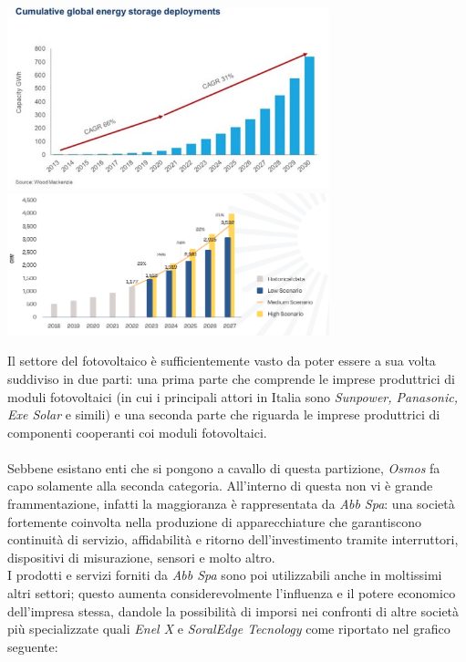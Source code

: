 \documentclass[a4paper, 12pt]{article}
\begin{document}
	\begin{center}
		\includegraphics[width=0.7\textwidth]{Images/previsioni_solare.jpg}
		\includegraphics[width=0.7\textwidth]{Images/andamento_pannelli2.png}
	\end{center}
	Il settore del fotovoltaico è sufficientemente vasto da poter essere a sua volta suddiviso in due parti: una prima parte che comprende le imprese produttrici di moduli fotovoltaici (in cui i principali attori in Italia sono \emph{Sunpower, Panasonic, Exe Solar} e simili) e una seconda parte che riguarda le imprese produttrici di componenti cooperanti coi moduli fotovoltaici.\\\\
	Sebbene esistano enti che si pongono a cavallo di questa partizione, \emph{Osmos} fa capo solamente alla seconda categoria. All'interno di questa non vi è grande frammentazione, infatti la maggioranza è rappresentata da \emph{Abb Spa}: una società fortemente coinvolta nella produzione di apparecchiature che garantiscono continuità di servizio, affidabilità e ritorno dell'investimento tramite interruttori, dispositivi di misurazione, sensori e molto altro.\\
	I prodotti e servizi forniti da \emph{Abb Spa} sono poi utilizzabili anche in moltissimi altri settori; questo aumenta considerevolmente l'influenza e il potere economico dell'impresa stessa, dandole la possibilità di imporsi nei confronti di altre società più specializzate quali \emph{Enel X} e \emph{SoralEdge Tecnology} come riportato nel grafico seguente:\\
\end{document}
